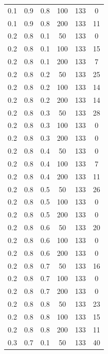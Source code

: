 \documentclass[a4paper,14pt, unknownkeysallowed]{extreport}
\begin{document}
\begin{center}
\begin{longtable}[c]{|c|c|c|c|c|c|}
         0.1 &  0.9 &  0.8 &  100 &   133 &     0 \\
         0.1 &  0.9 &  0.8 &  200 &   133 &    11 \\
        \hline
         0.2 &  0.8 &  0.1 &   50 &   133 &     0 \\
         0.2 &  0.8 &  0.1 &  100 &   133 &    15 \\
         0.2 &  0.8 &  0.1 &  200 &   133 &     7 \\
        \hline
         0.2 &  0.8 &  0.2 &   50 &   133 &    25 \\
         0.2 &  0.8 &  0.2 &  100 &   133 &    14 \\
         0.2 &  0.8 &  0.2 &  200 &   133 &    14 \\
        \hline
         0.2 &  0.8 &  0.3 &   50 &   133 &    28 \\
         0.2 &  0.8 &  0.3 &  100 &   133 &     0 \\
         0.2 &  0.8 &  0.3 &  200 &   133 &     0 \\
        \hline
         0.2 &  0.8 &  0.4 &   50 &   133 &     0 \\
         0.2 &  0.8 &  0.4 &  100 &   133 &     7 \\
         0.2 &  0.8 &  0.4 &  200 &   133 &    11 \\
        \hline
         0.2 &  0.8 &  0.5 &   50 &   133 &    26 \\
         0.2 &  0.8 &  0.5 &  100 &   133 &     0 \\
         0.2 &  0.8 &  0.5 &  200 &   133 &     0 \\
        \hline
         0.2 &  0.8 &  0.6 &   50 &   133 &    20 \\
         0.2 &  0.8 &  0.6 &  100 &   133 &     0 \\
         0.2 &  0.8 &  0.6 &  200 &   133 &     0 \\
        \hline
         0.2 &  0.8 &  0.7 &   50 &   133 &    16 \\
         0.2 &  0.8 &  0.7 &  100 &   133 &     0 \\
         0.2 &  0.8 &  0.7 &  200 &   133 &     0 \\
        \hline
         0.2 &  0.8 &  0.8 &   50 &   133 &    23 \\
         0.2 &  0.8 &  0.8 &  100 &   133 &    15 \\
         0.2 &  0.8 &  0.8 &  200 &   133 &    11 \\
        \hline
         0.3 &  0.7 &  0.1 &   50 &   133 &    40 \\

\end{longtable}
\end{center}
\end{document}
